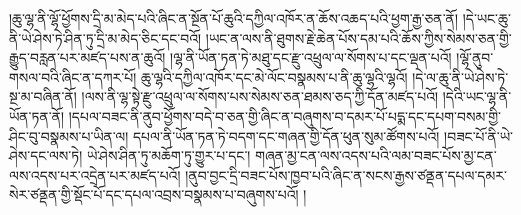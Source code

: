 །ཆུ་ལྷ་ནི་ལྷོ་ཕྱོགས་དྲི་མ་མེད་པའི་ཞིང་ན་སྔོན་པོ་ཆུའི་དཀྱིལ་འཁོར་ན་ཆོས་འཆད་པའི་ཕྱག་རྒྱ་ཅན་ནོ། །དེ་ཡང་ཆུ་ནི་ཡེ་ཤེས་ཏེ་ཤིན་ཏུ་དྲི་མ་མེད་ཅིང་དང་བའོ། །ཡང་ན་ལས་ནི་ཐུགས་རྗེ་ཆེན་པོས་དམ་པའི་ཆོས་ཀྱིས་སེམས་ཅན་གྱི་རྒྱུད་བརླན་པར་མཛད་པས་ན་ཆུའོ། །ལྷ་ནི་ཡོན་ཏན་ཏེ་མཐུ་དང་རྫུ་འཕྲུལ་ལ་སོགས་པ་དང་ལྡན་པའོ། །ལྷོ་ནུབ་གསལ་བའི་ཞིང་ན་དཀར་པོ། ཆུ་ལྷའི་དཀྱིལ་འཁོར་དང་མེ་ལོང་བསྣམས་པ་ནི་ཆུ་ལྷའི་ལྷའོ། །དེ་ལ་ཆུ་ནི་ཡེ་ཤེས་ཏེ་སྔ་མ་བཞིན་ནོ། །ལས་ནི་ལྷ་སྟེ་རྫུ་འཕྲུལ་ལ་སོགས་པས་སེམས་ཅན་ཐམས་ཅད་ཀྱི་དོན་མཛད་པའོ། །དེའི་ཡང་ལྷ་ནི་ཡོན་ཏན་ནོ། །དཔལ་བཟང་ནི་ནུབ་ཕྱོགས་བདེ་བ་ཅན་གྱི་ཞིང་ན་བཞུགས་བ་དམར་པོ་པདྨ་དང་དཔག་བསམ་གྱི་ཤིང་བུ་བསྣམས་པ་ཡིན་ལ། དཔལ་ནི་ཡོན་ཏན་ཏེ་བདག་དང་གཞན་གྱི་དོན་ཕུན་སུམ་ཚོགས་པའོ། །བཟང་པོ་ནི་ཡེ་ཤེས་དང་ལས་ཏེ། ཡེ་ཤེས་ཤིན་ཏུ་མཆོག་ཏུ་གྱུར་པ་དང་། གཞན་མྱ་ངན་ལས་འདས་པའི་ལམ་བཟང་པོས་མྱ་ངན་ལས་འདས་པར་འདྲེན་པར་མཛད་པའོ། །ནུབ་བྱང་དྲི་བཟང་པོས་ཁྱབ་པའི་ཞིང་ན་སངས་རྒྱས་ཙནྡན་དཔལ་དམར་སེར་ཙནྡན་གྱི་སྡོང་པོ་དང་དཔལ་འབྲས་བསྣམས་པ་བཞུགས་པའོ། །
